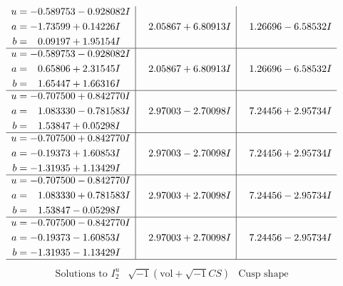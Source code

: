 \documentclass[1p]{elsarticle_modified}
\theoremstyle{definition}
\newcommand{\I}{\sqrt{-1}}
\begin{document}
$$\begin{array}{c|c|c}
\begin{aligned}
u &= -0.589753 - 0.928082 I \\
a &= -1.73599 + 0.14226 I \\
b &= \phantom{-}0.09197 + 1.95154 I\end{aligned}
 & \phantom{-}2.05867 + 6.80913 I & \phantom{-}1.26696 - 6.58532 I \\ \hline\begin{aligned}
u &= -0.589753 - 0.928082 I \\
a &= \phantom{-}0.65806 + 2.31545 I \\
b &= \phantom{-}1.65447 + 1.66316 I\end{aligned}
 & \phantom{-}2.05867 + 6.80913 I & \phantom{-}1.26696 - 6.58532 I \\ \hline\begin{aligned}
u &= -0.707500 + 0.842770 I \\
a &= \phantom{-}1.083330 - 0.781583 I \\
b &= \phantom{-}1.53847 + 0.05298 I\end{aligned}
 & \phantom{-}2.97003 - 2.70098 I & \phantom{-}7.24456 + 2.95734 I \\ \hline\begin{aligned}
u &= -0.707500 + 0.842770 I \\
a &= -0.19373 + 1.60853 I \\
b &= -1.31935 + 1.13429 I\end{aligned}
 & \phantom{-}2.97003 - 2.70098 I & \phantom{-}7.24456 + 2.95734 I \\ \hline\begin{aligned}
u &= -0.707500 - 0.842770 I \\
a &= \phantom{-}1.083330 + 0.781583 I \\
b &= \phantom{-}1.53847 - 0.05298 I\end{aligned}
 & \phantom{-}2.97003 + 2.70098 I & \phantom{-}7.24456 - 2.95734 I \\ \hline\begin{aligned}
u &= -0.707500 - 0.842770 I \\
a &= -0.19373 - 1.60853 I \\
b &= -1.31935 - 1.13429 I\end{aligned}
 & \phantom{-}2.97003 + 2.70098 I & \phantom{-}7.24456 - 2.95734 I\\
 \hline 
 \end{array}$$\newpage$$\begin{array}{c|c|c}  
\text{Solutions to }I^u_{2}& \I (\text{vol} + \sqrt{-1}CS) & \text{Cusp shape}\\

\end{array}$$
\end{document}
